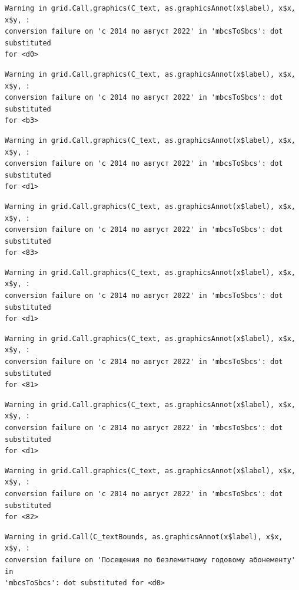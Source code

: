 \documentclass[
  letterpaper,
  DIV=11,
  numbers=noendperiod]{scrartcl}
\begin{document}
\begin{verbatim}
Warning in grid.Call.graphics(C_text, as.graphicsAnnot(x$label), x$x, x$y, :
conversion failure on 'с 2014 по август 2022' in 'mbcsToSbcs': dot substituted
for <d0>
\end{verbatim}

\begin{verbatim}
Warning in grid.Call.graphics(C_text, as.graphicsAnnot(x$label), x$x, x$y, :
conversion failure on 'с 2014 по август 2022' in 'mbcsToSbcs': dot substituted
for <b3>
\end{verbatim}

\begin{verbatim}
Warning in grid.Call.graphics(C_text, as.graphicsAnnot(x$label), x$x, x$y, :
conversion failure on 'с 2014 по август 2022' in 'mbcsToSbcs': dot substituted
for <d1>
\end{verbatim}

\begin{verbatim}
Warning in grid.Call.graphics(C_text, as.graphicsAnnot(x$label), x$x, x$y, :
conversion failure on 'с 2014 по август 2022' in 'mbcsToSbcs': dot substituted
for <83>
\end{verbatim}

\begin{verbatim}
Warning in grid.Call.graphics(C_text, as.graphicsAnnot(x$label), x$x, x$y, :
conversion failure on 'с 2014 по август 2022' in 'mbcsToSbcs': dot substituted
for <d1>
\end{verbatim}

\begin{verbatim}
Warning in grid.Call.graphics(C_text, as.graphicsAnnot(x$label), x$x, x$y, :
conversion failure on 'с 2014 по август 2022' in 'mbcsToSbcs': dot substituted
for <81>
\end{verbatim}

\begin{verbatim}
Warning in grid.Call.graphics(C_text, as.graphicsAnnot(x$label), x$x, x$y, :
conversion failure on 'с 2014 по август 2022' in 'mbcsToSbcs': dot substituted
for <d1>
\end{verbatim}

\begin{verbatim}
Warning in grid.Call.graphics(C_text, as.graphicsAnnot(x$label), x$x, x$y, :
conversion failure on 'с 2014 по август 2022' in 'mbcsToSbcs': dot substituted
for <82>
\end{verbatim}

\begin{verbatim}
Warning in grid.Call(C_textBounds, as.graphicsAnnot(x$label), x$x, x$y, :
conversion failure on 'Посещения по безлемитному годовому абонементу' in
'mbcsToSbcs': dot substituted for <d0>
\end{verbatim}
\end{document}
